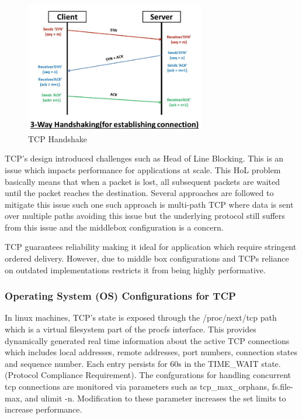\begin{figure}[H]
\caption{TCP Handshake}
\centering
\includegraphics[width=0.7\textwidth]{SOA/tcp.png}
\end{figure}


TCP's design introduced challenges such as Head of Line Blocking. This is an issue which impacts performance for applications at scale. This HoL problem basically means that when a packet is lost, all subsequent packets are waited until the packet reaches the destination. Several approaches are followed to mitigate this issue such one such approach is multi-path TCP where data is sent over multiple paths avoiding this issue but the underlying protocol still suffers from this issue and the middlebox configuration is a concern.

TCP guarantees reliability making it ideal for application which require stringent ordered delivery. However, due to middle box configurations and TCPs reliance on outdated implementations restricts it from being highly performative.


\subsubsection{Operating System (OS) Configurations for TCP}

In linux machines, TCP's state is exposed  through the /proc/next/tcp path which is a virtual filesystem part of the procfs interface. This provides dynamically generated real time information about the active TCP connections which includes local addresses, remote addresses, port numbers, connection states and sequence number. Each entry persists for 60s  in the TIME\_WAIT state. (Protocol Compliance Requirement). The confgurations for handling concurrent tcp connections are monitored via parameters such as tcp\_max\_orphans, fs.file-max, and ulimit -n. Modification to these parameter increases the set limits to increase performance. 


